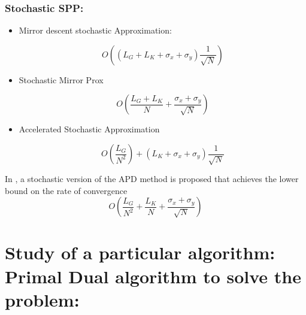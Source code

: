 \documentclass[10pt]{article}
\begin{document}
\subsubsection{ Stochastic SPP: }
\begin{itemize}
\item Mirror descent stochastic Approximation:

$$
O((L_{G} + L_{K} + \sigma_{x} + \sigma_{y})\dfrac{1}{\sqrt{N}})
$$

\item Stochastic Mirror Prox

$$
O(\dfrac{L_{G} + L_{K}}{N} + \dfrac{\sigma_{x} + \sigma_{y}}{\sqrt{N}})
$$

\item Accelerated Stochastic Approximation

$$
O(\dfrac{L_{G}}{N^{2}}) + (L_{K} + \sigma_{x} + \sigma_{y})\dfrac{1}{\sqrt{N}}
$$
\end{itemize}

In \cite{ChenLanOuyang}, a stochastic version of the APD method is proposed that achieves the lower bound on the rate 
of convergence
$$
O(\dfrac{L_{G}}{N^{2}} + \dfrac{L_{K}}{N} + \dfrac{\sigma_{x} + \sigma_{y}}{\sqrt{N}})
$$

%

\section{Study of a particular algorithm: Primal Dual algorithm to solve the problem: }
\end{document}
